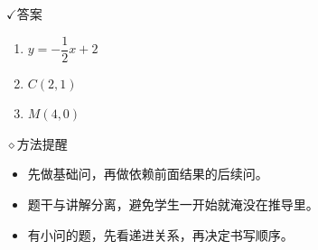 \documentclass{exam-zh}
\newcommand{\eduIconCheck}{\(\checkmark\)}
\newcommand{\eduIconPin}{\(\diamond\)}
\newenvironment{eduBulletList}{%
  \begin{itemize}[
    label=\textbullet,
    leftmargin=5mm,
    itemsep=1.2mm,
    topsep=0pt,
    parsep=0pt
  ]
}{%
  \end{itemize}
}
\newenvironment{eduBottomGrid}{%
  \vspace{1mm}
  \par\noindent
}{%
  \par\vspace{1mm}
}
\newenvironment{eduSummaryLeft}{%
  \begin{minipage}[t]{0.33\linewidth}
}{%
  \end{minipage}
}
\newcommand{\eduSummaryDivider}{%
  \hspace{4mm}{\color{edu-line}\vrule width 0.35pt}\hspace{4mm}%
}
\newenvironment{eduSummaryRight}{%
  \begin{minipage}[t]{0.58\linewidth}
}{%
  \end{minipage}
}
\newenvironment{eduPlainList}{%
  \begin{enumerate}[
    label=(\arabic*),
    leftmargin=7mm,
    itemsep=1.2mm,
    topsep=0pt,
    parsep=0pt
  ]
}{%
  \end{enumerate}
}
\begin{document}
\begin{eduBottomGrid}
  \begin{eduSummaryLeft}
    \begin{eduSummaryBlock}{\eduIconCheck}{答案}
    \begin{eduPlainList}
      \item $y = -\dfrac{1}{2}x + 2$      \item $C(2,1)$      \item $M(4,0)$    \end{eduPlainList}
    \end{eduSummaryBlock}
  \end{eduSummaryLeft}
  \eduSummaryDivider
  \begin{eduSummaryRight}
    \begin{eduSummaryBlock}{\eduIconPin}{方法提醒}
    \begin{eduBulletList}
      \item 先做基础问，再做依赖前面结果的后续问。      \item 题干与讲解分离，避免学生一开始就淹没在推导里。      \item 有小问的题，先看递进关系，再决定书写顺序。    \end{eduBulletList}
    \end{eduSummaryBlock}
  \end{eduSummaryRight}
\end{eduBottomGrid}
\end{document}
